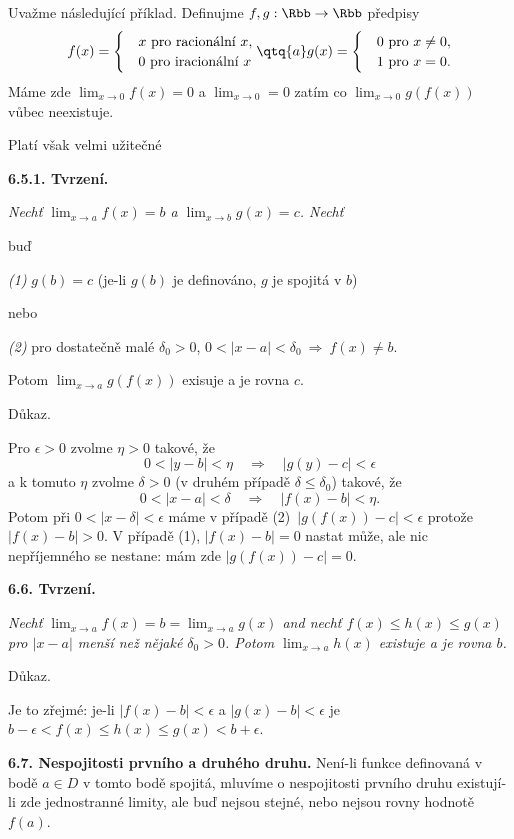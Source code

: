 \documentclass[12pt]{article}
\begin{document}
{Uvažme následující příklad. Definujme $f,g:\Rbb\to\Rbb$ předpisy
$$
f(x)=\begin{cases}&x\ \text{pro racionální}\ x,\\
                  &0\ \text{pro iracionální}\ x
                  \end{cases}
                  \qtq{a}
 g(x)=\begin{cases}&0\ \text{pro}\ x\neq 0,\\
                  &1\ \text{pro}\ x=0.
                  \end{cases} 
$$                                  
Máme zde $\lim_{x\to 0}f(x)=0$ a $\lim_{x\to 0}=0$ zatím co $\lim_{x\to 0}g(f(x))$ vůbec neexistuje.

Platí však velmi užitečné 

\medskip

{\bf 6.5.1. Tvrzení.}  {\em Nechť $\lim_{x\to a}f(x)=b$ a $\lim_{x\to b}g(x)=c$.
Nechť

\noindent buď

{\em (1)} $g(b)=c$ (je-li $g(b)$ je definováno, $g$  je spojitá v $b$)

\noindent nebo


{\em (2)} pro dostatečně malé $\delta_0>0$, $0<|x-a|<\delta_0\ \Rightarrow\ f(x)\neq b$.

\noindent Potom $\lim_{x\to a}g(f(x))$ exisuje a je rovna $c$.

Důkaz.} Pro $\epsilon>0$ zvolme $\eta>0$ takové, že
$$
0<|y-b|<\eta \quad\Rightarrow\quad |g(y)-c|<\epsilon
$$
a k tomuto $\eta$ zvolme $\delta>0$ (v druhém případě $\delta\leq\delta_0$) takové, že
$$
0<|x-a|<\delta \quad\Rightarrow\quad |f(x)-b|<\eta.
$$
Potom při $0<|x-\delta|<\epsilon$ máme v případě  (2)\ 
$|g(f(x))-c|<\epsilon$ protože $|f(x)-b|>0$. V případě (1), $|f(x)-b|=0$ nastat může, ale nic nepříjemného se nestane: mám zde $|g(f(x))-c|=0$. \sq

\bigskip

{\bf 6.6. Tvrzení.}  {\em Nechť $\lim_{x\to a}f(x)=b=\lim_{x\to a}g(x)$ and nechť
$f(x)\leq h(x)\leq g(x)$ pro $|x-a|$ menší než nějaké $\delta_0>0$. Potom
 $\lim_{x\to a}h(x)$ existuje a je rovna $b$.
 
 Důkaz.} Je to zřejmé: je-li $|f(x)-b|<\epsilon$ a $|g(x)-b|<\epsilon$ je
 $b-\epsilon<f(x)\leq h(x)\leq g(x)<b+\epsilon$.\sq


\bigskip

{\bf 6.7. Nespojitosti prvního a druhého druhu.} Není-li funkce definovaná
v bodě $a\in D$ v tomto bodě spojitá, mluvíme o nespojitosti prvního druhu existují-li zde jednostranné limity, ale buď nejsou stejné, nebo nejsou rovny hodnotě $f(a)$.

}
\end{document}
